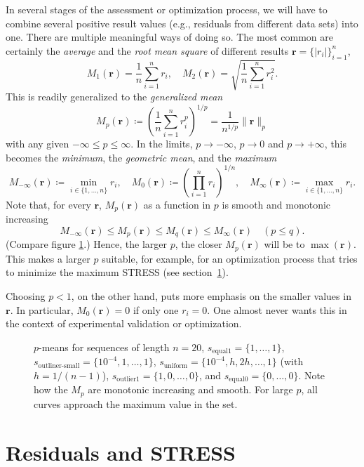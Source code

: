 \documentclass{scrartcl}
\theoremstyle{named}
\newcommand\rr{\ensuremath{\bm{r}}}
\begin{document}
In several stages of the assessment or optimization process, we will have to combine
several positive result values (e.g., residuals from different data sets) into one.
There are multiple meaningful ways of doing so. The most common are certainly the
\emph{average} and the \emph{root mean square} of different results
$\rr = \{|r_i|\}_{i=1}^n$,
\[
  M_1(\rr) = \frac{1}{n}\sum_{i=1}^n r_i,\quad
  M_2(\rr) = \sqrt{\frac{1}{n}\sum_{i=1}^n r_i^2}.
\]
This is readily generalized to the
\emph{generalized mean}
\[
  M_p(\rr) \coloneqq \left(\frac{1}{n}\sum_{i=1}^n r_i^p\right)^{1/p} =
  \frac{1}{n^{1/p}} \|\rr\|_p
\]
with any given $-\infty \le p \le \infty$. In the limits, $p\to-\infty$, $p\to 0$ and
$p\to +\infty$, this becomes the \emph{minimum}, the \emph{geometric mean}, and the
\emph{maximum}
\[
  M_{-\infty}(\rr) \coloneqq \min_{i\in\{1,\dots,n\}} r_i, \quad
  M_0(\rr) \coloneqq \left(\prod_{i=1}^n r_i\right)^{1/n}, \quad
  M_{\infty}(\rr) \coloneqq \max_{i\in\{1,\dots,n\}} r_i.
\]
Note that, for every $\rr$, $M_p(\rr)$ as a function in $p$ is smooth and monotonic
increasing
\[
  M_{-\infty}(\rr) \le M_p(\rr) \le M_q(\rr) \le M_{\infty}(\rr) \quad (p\le q).
\]
(Compare figure \ref{fig:1}.)
Hence, the larger $p$, the closer $M_p(\rr)$ will be to $\max(\rr)$.
This makes a larger $p$ suitable, for example, for an optimization process that tries to
minimize the maximum STRESS (see section~\ref{}).

Choosing $p < 1$, on the other hand, puts more emphasis on the smaller values in $\rr$.
In particular, $M_0(\rr)=0$ if only one $r_i=0$. One almost never wants this in the
context of experimental validation or optimization.

\begin{figure}
  \centering
  
  \caption{$p$-means for sequences of length $n=20$, $s_\text{equal1} = \{1, \dots,
  1\}$, $s_\text{outliner-small} = \{10^{-4}, 1,\dots, 1\}$, $s_\text{uniform} =
  \{10^{-4}, h, 2h, \dots, 1\}$ (with $h = 1 / (n-1)$), $s_\text{outlier1} = \{1,
  0,\dots, 0\}$, and $s_\text{equal0} = \{0,\dots,0\}$. Note how the $M_p$ are monotonic
  increasing and smooth. For large $p$, all curves approach the maximum value in the
  set.}
  \label{fig:1}
\end{figure}


\section{Residuals and STRESS}
\end{document}
